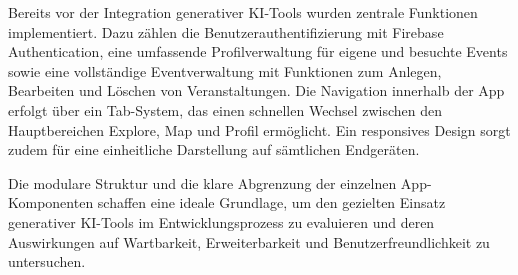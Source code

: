 Bereits vor der Integration generativer KI-Tools wurden zentrale Funktionen
implementiert. Dazu zählen die Benutzerauthentifizierung mit Firebase
Authentication, eine umfassende Profilverwaltung für eigene und besuchte Events
sowie eine vollständige Eventverwaltung mit Funktionen zum Anlegen, Bearbeiten
und Löschen von Veranstaltungen. Die Navigation innerhalb der App erfolgt über
ein Tab-System, das einen schnellen Wechsel zwischen den Hauptbereichen
Explore, Map und Profil ermöglicht. Ein responsives Design sorgt zudem für eine
einheitliche Darstellung auf sämtlichen Endgeräten.

Die modulare Struktur und die klare Abgrenzung der einzelnen App-Komponenten
schaffen eine ideale Grundlage, um den gezielten Einsatz generativer KI-Tools
im Entwicklungsprozess zu evaluieren und deren Auswirkungen auf Wartbarkeit,
Erweiterbarkeit und Benutzerfreundlichkeit zu untersuchen.
